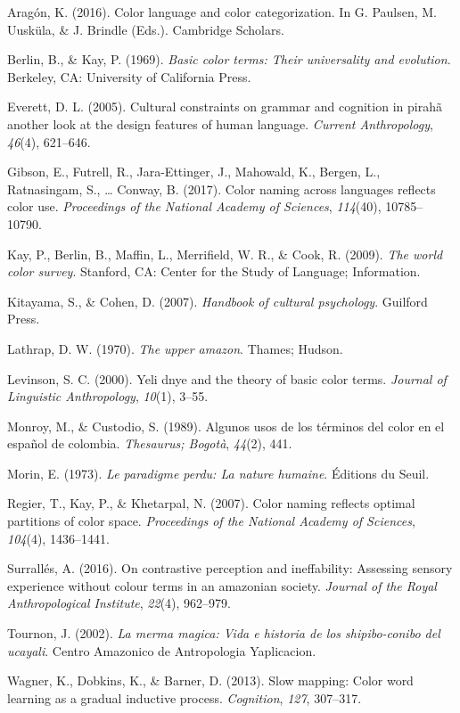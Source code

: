 \documentclass[
  english,
  ,man,floatsintext]{apa6}
\begin{document}
\leavevmode\hypertarget{ref-aragon2016}{}%
Aragón, K. (2016). Color language and color categorization. In G. Paulsen, M. Uusküla, \& J. Brindle (Eds.). Cambridge Scholars.

\leavevmode\hypertarget{ref-berlin1969}{}%
Berlin, B., \& Kay, P. (1969). \emph{Basic color terms: Their universality and evolution}. Berkeley, CA: University of California Press.

\leavevmode\hypertarget{ref-everett2005}{}%
Everett, D. L. (2005). Cultural constraints on grammar and cognition in pirahã another look at the design features of human language. \emph{Current Anthropology}, \emph{46}(4), 621--646.

\leavevmode\hypertarget{ref-gibson2017}{}%
Gibson, E., Futrell, R., Jara-Ettinger, J., Mahowald, K., Bergen, L., Ratnasingam, S., \ldots{} Conway, B. (2017). Color naming across languages reflects color use. \emph{Proceedings of the National Academy of Sciences}, \emph{114}(40), 10785--10790.

\leavevmode\hypertarget{ref-berlin2009}{}%
Kay, P., Berlin, B., Maffin, L., Merrifield, W. R., \& Cook, R. (2009). \emph{The world color survey}. Stanford, CA: Center for the Study of Language; Information.

\leavevmode\hypertarget{ref-kitayama2007}{}%
Kitayama, S., \& Cohen, D. (2007). \emph{Handbook of cultural psychology}. Guilford Press.

\leavevmode\hypertarget{ref-lathrap1970}{}%
Lathrap, D. W. (1970). \emph{The upper amazon}. Thames; Hudson.

\leavevmode\hypertarget{ref-levinson2000}{}%
Levinson, S. C. (2000). Yeli dnye and the theory of basic color terms. \emph{Journal of Linguistic Anthropology}, \emph{10}(1), 3--55.

\leavevmode\hypertarget{ref-monroy1989}{}%
Monroy, M., \& Custodio, S. (1989). Algunos usos de los términos del color en el español de colombia. \emph{Thesaurus; Bogotà}, \emph{44}(2), 441.

\leavevmode\hypertarget{ref-morin1973}{}%
Morin, E. (1973). \emph{Le paradigme perdu: La nature humaine}. Éditions du Seuil.

\leavevmode\hypertarget{ref-regier2007}{}%
Regier, T., Kay, P., \& Khetarpal, N. (2007). Color naming reflects optimal partitions of color space. \emph{Proceedings of the National Academy of Sciences}, \emph{104}(4), 1436--1441.

\leavevmode\hypertarget{ref-surralles2016}{}%
Surrallés, A. (2016). On contrastive perception and ineffability: Assessing sensory experience without colour terms in an amazonian society. \emph{Journal of the Royal Anthropological Institute}, \emph{22}(4), 962--979.

\leavevmode\hypertarget{ref-tournon2002}{}%
Tournon, J. (2002). \emph{La merma magica: Vida e historia de los shipibo-conibo del ucayali}. Centro Amazonico de Antropologia Yaplicacion.

\leavevmode\hypertarget{ref-wagner2013}{}%
Wagner, K., Dobkins, K., \& Barner, D. (2013). Slow mapping: Color word learning as a gradual inductive process. \emph{Cognition}, \emph{127}, 307--317.

\endgroup
\end{document}
